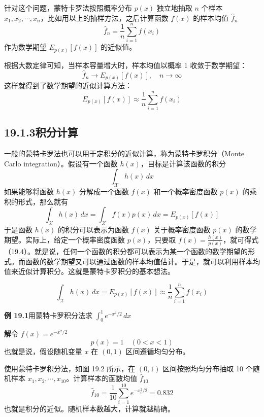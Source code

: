 \documentclass[UTF8,12pt,a4paper,fontset=fandol]{ctexart}
\begin{document}
针对这个问题，蒙特卡罗法按照概率分布 $p(x)$ 独立地抽取 $n$ 个样本 $x_1,x_2,\cdots,x_n$，比如用以上的抽样方法，之后计算函数 $f(x)$ 的样本均值 $\hat f_n$
\begin{equation}
\hat f_n=\frac{1}{n}\sum_{i=1}^n f(x_i)
\tag{19.1}
\end{equation}
作为数学期望 $E_{p(x)}[f(x)]$ 的近似值。

根据大数定律可知，当样本容量增大时，样本均值以概率 1 收敛于数学期望：
\begin{equation}
\hat f_n\to E_{p(x)}[f(x)],\quad n\to\infty
\tag{19.2}
\end{equation}
这样就得到了数学期望的近似计算方法：
\begin{equation}
E_{p(x)}[f(x)]\approx \frac{1}{n}\sum_{i=1}^n f(x_i)
\tag{19.3}
\end{equation}

\subsection*{19.1.3\quad 积分计算}

一般的蒙特卡罗法也可以用于定积分的近似计算，称为蒙特卡罗积分（Monte Carlo integration）。假设有一个函数 $h(x)$，目标是计算该函数的积分
\[
\int_{\mathcal{X}} h(x)\,dx
\]
如果能够将函数 $h(x)$ 分解成一个函数 $f(x)$ 和一个概率密度函数 $p(x)$ 的乘积的形式，那么就有
\begin{equation}
\int_{\mathcal{X}} h(x)\,dx=\int_{\mathcal{X}} f(x)p(x)\,dx=E_{p(x)}[f(x)]
\tag{19.4}
\end{equation}
于是函数 $h(x)$ 的积分可以表示为函数 $f(x)$ 关于概率密度函数 $p(x)$ 的数学期望。实际上，给定一个概率密度函数 $p(x)$，只要取 $f(x)=\frac{h(x)}{p(x)}$，就可得式（19.4）。就是说，任何一个函数的积分都可以表示为某一个函数的数学期望的形式。而函数的数学期望又可以通过函数的样本均值估计。于是，就可以利用样本均值来近似计算积分。这就是蒙特卡罗积分的基本想法。

\begin{equation}
\int_{\mathcal{X}} h(x)\,dx=E_{p(x)}[f(x)]\approx \frac{1}{n}\sum_{i=1}^n f(x_i)
\tag{19.5}
\end{equation}

\noindent\textbf{例 19.1}\quad 用蒙特卡罗积分法求 $\displaystyle\int_0^1 e^{-x^2/2}\,dx$

\noindent\textbf{解}\quad 令 $f(x)=e^{-x^2/2}$
\[
p(x)=1\quad (0<x<1)
\]
也就是说，假设随机变量 $x$ 在 $(0,1)$ 区间遵循均匀分布。

使用蒙特卡罗积分法，如图 19.2 所示，在 $(0,1)$ 区间按照均匀分布抽取 10 个随机样本 $x_1,x_2,\cdots,x_{10}$。计算样本的函数均值 $\hat f_{10}$
\[
\hat f_{10}=\frac{1}{10}\sum_{i=1}^{10}e^{-x_i^2/2}=0.832
\]
也就是积分的近似。随机样本数越大，计算就越精确。
\end{document}
